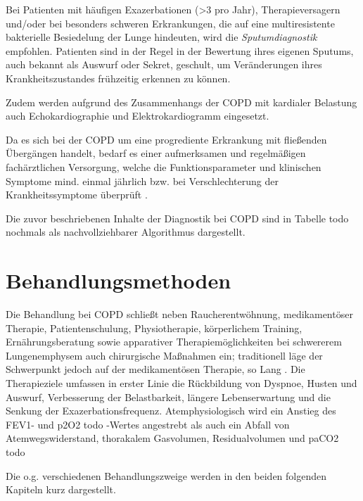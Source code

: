 Bei Patienten mit häufigen Exazerbationen (>3 pro Jahr), Therapieversagern und/oder bei besonders schweren Erkrankungen, die auf eine multiresistente bakterielle Besiedelung der Lunge hindeuten, wird die \emph{Sputumdiagnostik} empfohlen. Patienten sind in der Regel in der Bewertung ihres eigenen Sputums, auch bekannt als Auswurf oder Sekret, geschult, um Veränderungen ihres Krankheitszustandes frühzeitig erkennen zu können. 

Zudem werden aufgrund des Zusammenhangs der COPD mit kardialer Belastung auch Echokardiographie und Elektrokardiogramm eingesetzt.

Da es sich bei der COPD um eine progrediente Erkrankung mit fließenden Übergängen handelt, bedarf es einer aufmerksamen und regelmäßigen fachärztlichen Versorgung, welche die Funktionsparameter und klinischen Symptome mind. einmal jährlich bzw. bei Verschlechterung der Krankheitssymptome überprüft \autocite[vgl.][e8ff.]{vogelmeier2007}.

Die zuvor beschriebenen Inhalte der Diagnostik bei COPD sind in Tabelle todo nochmals als nachvollziehbarer Algorithmus dargestellt.

\section{Behandlungsmethoden}
\label{behandlungsmethoden}
Die Behandlung bei COPD schließt neben Raucherentwöhnung, medikamentöser Therapie, Patientenschulung, Physiotherapie, körperlichem Training, Ernährungsberatung sowie apparativer Therapiemöglichkeiten bei schwererem Lungenemphysem auch chirurgische Maßnahmen ein; traditionell läge der Schwerpunkt jedoch auf der medikamentösen Therapie, so Lang \autocite[vgl.][287]{lang2007}. Die Therapieziele umfassen in erster Linie die Rückbildung von Dyspnoe, Husten und Auswurf, Verbesserung der Belastbarkeit, längere Lebenserwartung und die Senkung der Exazerbationsfrequenz. Atemphysiologisch wird ein Anstieg des FEV1- und p2O2 todo -Wertes angestrebt als auch ein Abfall von Atemwegswiderstand, thorakalem Gasvolumen, Residualvolumen und paCO2 todo \author[vgl.][158]{lorenz2009}
Die o.g. verschiedenen Behandlungszweige werden in den beiden folgenden Kapiteln kurz dargestellt.

